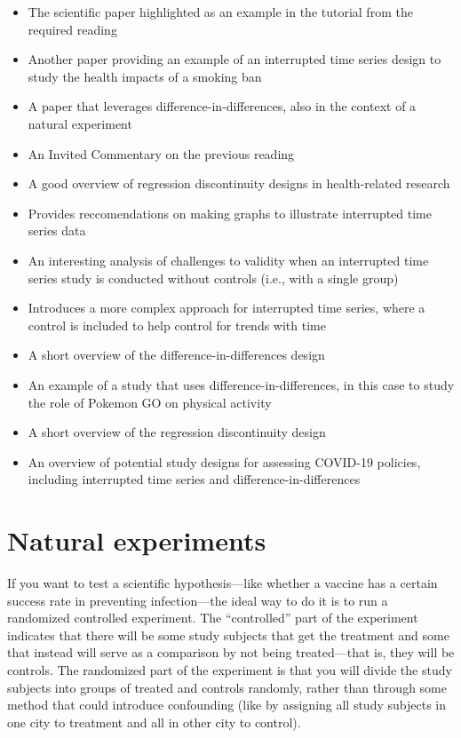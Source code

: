 \documentclass[
]{book}
\providecommand{\tightlist}{%
  \setlength{\itemsep}{0pt}\setlength{\parskip}{0pt}}
\begin{document}
\begin{itemize}
\tightlist
\item
  \citet{barone2011effects} The scientific paper highlighted as an example in the tutorial from the required reading
\item
  \citet{sargent2004reduced} Another paper providing an example of an interrupted time series design to study the health impacts of a smoking ban
\item
  \citet{casey2018retirements} A paper that leverages difference-in-differences, also in the context of a natural experiment
\item
  \citet{mendola2018invited} An Invited Commentary on the previous reading
\item
  \citet{venkataramani2016regression} A good overview of regression discontinuity designs in health-related research
\item
  \citet{turner2021creating} Provides reccomendations on making graphs to illustrate interrupted time series data
\item
  \citet{linden2017challenges} An interesting analysis of challenges to validity when an interrupted time series study is conducted without controls (i.e., with a single group)
\item
  \citet{bottomley2019analysing} Introduces a more complex approach for interrupted time series, where a control is included to help control for trends with time
\item
  \citet{dimick2014methods} A short overview of the difference-in-differences design
\item
  \citet{howe2016gotta} An example of a study that uses difference-in-differences, in this case to study the role of Pokemon GO on physical activity
\item
  \citet{maciejewski2020regression} A short overview of the regression discontinuity design
\item
  \citet{haber2021covid} An overview of potential study designs for assessing COVID-19 policies, including interrupted time series and difference-in-differences
\end{itemize}

\hypertarget{natural-experiments-1}{%
\section{Natural experiments}\label{natural-experiments-1}}

If you want to test a scientific hypothesis---like whether a vaccine has a certain success rate in preventing infection---the ideal way to do it is to run a randomized controlled experiment. The ``controlled'' part of the experiment indicates that there will be some study subjects that get the treatment and some that instead will serve as a comparison by not being treated---that is, they will be controls. The randomized part of the experiment is that you will divide the study subjects into groups of treated and controls randomly, rather than through some method that could introduce confounding (like by assigning all study subjects in one city to treatment and all in other city to control).
\end{document}
